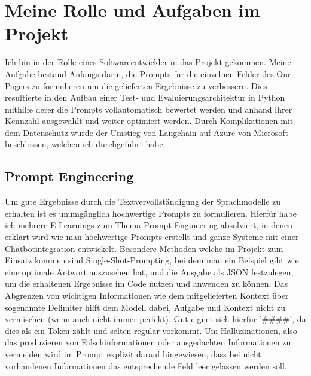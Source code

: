 \section{Meine Rolle und Aufgaben im Projekt}
Ich bin in der Rolle eines Softwareentwickler in das Projekt gekommen. Meine Aufgabe bestand Anfangs darin, die Prompts für die einzelnen 
Felder des One Pagers zu formulieren um die gelieferten Ergebnisse zu verbessern. Dies resultierte in den Aufbau einer 
Test- und Evaluierungsarchitektur in Python mithilfe derer die Prompts vollautomatisch bewertet werden und anhand ihrer Kennzahl 
ausgewählt und weiter optimiert werden. Durch Komplikationen mit dem Datenschutz wurde der Umstieg von Langchain auf 
Azure von Microsoft beschlossen, welchen ich durchgeführt habe. 

\subsection{Prompt Engineering}
Um gute Ergebnisse durch die Textvervollständigung der Sprachmodelle zu erhalten ist es unumgänglich hochwertige Prompts zu formulieren.
Hierfür habe ich mehrere E-Learnings zum Thema Prompt Engineering absolviert, in denen erklärt wird wie man hochwertige Prompts erstellt und 
ganze Systeme mit einer Chatbotintegration entwickelt. Besondere Methoden welche im Projekt zum Einsatz kommen sind Single-Shot-Prompting, 
bei dem man ein Beispiel gibt wie eine optimale Antwort auszusehen hat, und die Ausgabe als JSON festzulegen, um die erhaltenen Ergebnisse 
im Code nutzen und anwenden zu können. Das Abgrenzen von wichtigen Informationen wie dem mitgelieferten Kontext über sogenannte Delimiter hilft
dem Modell dabei, Aufgabe und Kontext nicht zu vermischen (wenn auch nicht immer perfekt). Gut eignet sich hierfür '\#\#\#\#', da dies als 
ein Token zählt und selten regulär vorkommt. Um Halluzinationen, also das produzieren von Falschinformationen oder ausgedachten Informationen zu 
vermeiden wird im Prompt explizit darauf hingewiesen, dass bei nicht vorhandenen Informationen das entsprechende Feld leer gelassen werden soll. 

